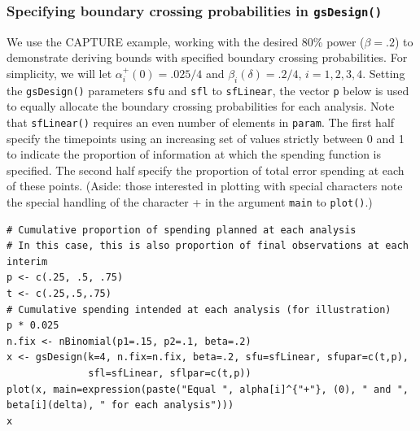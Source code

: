 \subsubsection{Specifying boundary crossing probabilities in \texttt{gsDesign()}}

We use the CAPTURE example, working with the desired 80\% power ($\beta=.2$) to demonstrate deriving bounds with specified boundary crossing probabilities. 
For simplicity, we will let $\alpha_i^+(0)=.025/4$ and $\beta_i(\delta)=.2/4$, $i=1,2,3,4$. 
Setting the \texttt{gsDesign()} parameters \texttt{sfu} and \texttt{sfl} to \texttt{sfLinear}, the vector \texttt{p} below is used to equally allocate the boundary crossing probabilities for each analysis.
Note that \texttt{sfLinear()} requires an even number of elements in \texttt{param}.
The first half specify the timepoints using an increasing set of values strictly between 0 and 1 to indicate the proportion of information at which the spending function is specified.
The second half specify the proportion of total error spending at each of these points.
(Aside: those interested in plotting with special characters note the special handling of the character + in the argument \texttt{main} to \texttt{plot()}.) 
\bigskip

\begin{verbatim}
# Cumulative proportion of spending planned at each analysis
# In this case, this is also proportion of final observations at each interim
p <- c(.25, .5, .75)
t <- c(.25,.5,.75)
# Cumulative spending intended at each analysis (for illustration)
p * 0.025
n.fix <- nBinomial(p1=.15, p2=.1, beta=.2)
x <- gsDesign(k=4, n.fix=n.fix, beta=.2, sfu=sfLinear, sfupar=c(t,p),
              sfl=sfLinear, sflpar=c(t,p))
plot(x, main=expression(paste("Equal ", alpha[i]^{"+"}, (0), " and ", 
beta[i](delta), " for each analysis")))
x

\end{verbatim}
\bigskip


